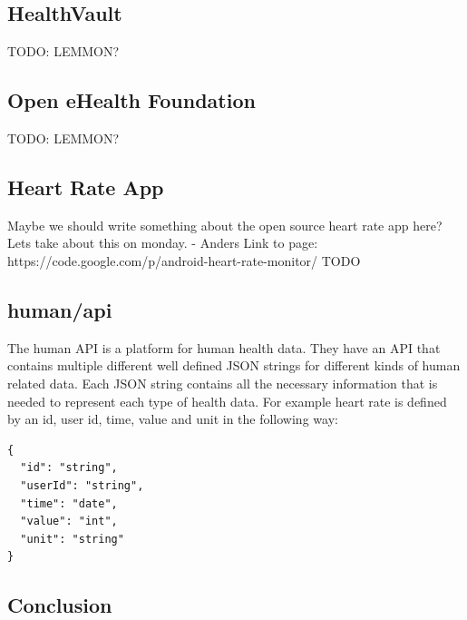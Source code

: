 \subsection{HealthVault}

TODO: LEMMON?

\subsection{Open eHealth Foundation}

TODO: LEMMON?

\subsection{Heart Rate App}

Maybe we should write something about the open source heart rate app here?
Lets take about this on monday. - Anders
Link to page: https://code.google.com/p/android-heart-rate-monitor/
TODO

\subsection{human/api} \nocite{HumanAPI}

The human API is a platform for human health data. 
They have an API that contains multiple different well defined JSON strings for different kinds of human related data.
Each JSON string contains all the necessary information that is needed to represent each type of health data.
For example heart rate is defined by an id, user id, time, value and unit in the following way:

\begin{verbatim}
{
  "id": "string",
  "userId": "string",
  "time": "date",
  "value": "int",
  "unit": "string"
}
\end{verbatim}

\subsection{Conclusion}


